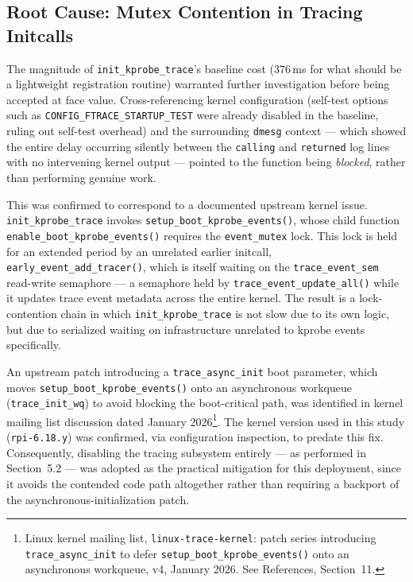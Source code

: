 \documentclass[11pt,a4paper]{article}
\begin{document}
\subsection{Root Cause: Mutex Contention in Tracing Initcalls}

The magnitude of \texttt{init\_kprobe\_trace}'s baseline cost (376\,ms for what should be a lightweight registration routine) warranted further investigation before being accepted at face value. Cross-referencing kernel configuration (self-test options such as \texttt{CONFIG\_FTRACE\_STARTUP\_TEST} were already disabled in the baseline, ruling out self-test overhead) and the surrounding \texttt{dmesg} context — which showed the entire delay occurring silently between the \texttt{calling} and \texttt{returned} log lines with no intervening kernel output — pointed to the function being \textit{blocked}, rather than performing genuine work.

This was confirmed to correspond to a documented upstream kernel issue. \texttt{init\_kprobe\_trace} invokes \texttt{setup\_boot\_kprobe\_events()}, whose child function \texttt{enable\_boot\_kprobe\_events()} requires the \texttt{event\_mutex} lock. This lock is held for an extended period by an unrelated earlier initcall, \texttt{early\_event\_add\_tracer()}, which is itself waiting on the \texttt{trace\_event\_sem} read-write semaphore — a semaphore held by \texttt{trace\_event\_update\_all()} while it updates trace event metadata across the entire kernel. The result is a lock-contention chain in which \texttt{init\_kprobe\_trace} is not slow due to its own logic, but due to serialized waiting on infrastructure unrelated to kprobe events specifically.

An upstream patch introducing a \texttt{trace\_async\_init} boot parameter, which moves \texttt{setup\_boot\_kprobe\_events()} onto an asynchronous workqueue (\texttt{trace\_init\_wq}) to avoid blocking the boot-critical path, was identified in kernel mailing list discussion dated January 2026\footnote{Linux kernel mailing list, \texttt{linux-trace-kernel}: patch series introducing \texttt{trace\_async\_init} to defer \texttt{setup\_boot\_kprobe\_events()} onto an asynchronous workqueue, v4, January 2026. See References, Section~11.}. The kernel version used in this study (\texttt{rpi-6.18.y}) was confirmed, via configuration inspection, to predate this fix. Consequently, disabling the tracing subsystem entirely — as performed in Section~5.2 — was adopted as the practical mitigation for this deployment, since it avoids the contended code path altogether rather than requiring a backport of the asynchronous-initialization patch.
\end{document}

